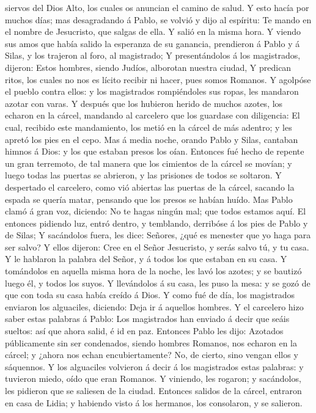 siervos del Dios Alto, los cuales os anuncian el camino de salud.
 Y esto hacía por muchos días; mas desagradando á Pablo,
se volvió y dijo al espíritu: Te mando en el nombre de Jesucristo, que
salgas de ella. Y salió en la misma hora.  Y viendo sus
amos que había salido la esperanza de su ganancia, prendieron á Pablo y
á Silas, y los trajeron al foro, al magistrado;  Y
presentándolos á los magistrados, dijeron: Estos hombres, siendo Judíos,
alborotan nuestra ciudad,  Y predican ritos, los cuales
no nos es lícito recibir ni hacer, pues somos Romanos.  Y
agolpóse el pueblo contra ellos: y los magistrados rompiéndoles sus
ropas, les mandaron azotar con varas.  Y después que los
hubieron herido de muchos azotes, los echaron en la cárcel, mandando al
carcelero que los guardase con diligencia:  El cual,
recibido este mandamiento, los metió en la cárcel de más adentro; y les
apretó los pies en el cepo.  Mas á media noche, orando
Pablo y Silas, cantaban himnos á Dios: y los que estaban presos los
oían.  Entonces fué hecho de repente un gran terremoto,
de tal manera que los cimientos de la cárcel se movían; y luego todas
las puertas se abrieron, y las prisiones de todos se soltaron.
 Y despertado el carcelero, como vió abiertas las puertas
de la cárcel, sacando la espada se quería matar, pensando que los presos
se habían huído.  Mas Pablo clamó á gran voz, diciendo:
No te hagas ningún mal; que todos estamos aquí.  El
entonces pidiendo luz, entró dentro, y temblando, derribóse á los pies
de Pablo y de Silas;  Y sacándolos fuera, les dice:
Señores, ¿qué es menester que yo haga para ser salvo?  Y
ellos dijeron: Cree en el Señor Jesucristo, y serás salvo tú, y tu casa.
 Y le hablaron la palabra del Señor, y á todos los que
estaban en su casa.  Y tomándolos en aquella misma hora
de la noche, les lavó los azotes; y se bautizó luego él, y todos los
suyos.  Y llevándolos á su casa, les puso la mesa: y se
gozó de que con toda su casa había creído á Dios.  Y como
fué de día, los magistrados enviaron los alguaciles, diciendo: Deja ir á
aquellos hombres.  Y el carcelero hizo saber estas
palabras á Pablo: Los magistrados han enviado á decir que seáis sueltos:
así que ahora salid, é id en paz.  Entonces Pablo les
dijo: Azotados públicamente sin ser condenados, siendo hombres Romanos,
nos echaron en la cárcel; y ¿ahora nos echan encubiertamente? No, de
cierto, sino vengan ellos y sáquennos.  Y los alguaciles
volvieron á decir á los magistrados estas palabras: y tuvieron miedo,
oído que eran Romanos.  Y viniendo, les rogaron; y
sacándolos, les pidieron que se saliesen de la ciudad. 
Entonces salidos de la cárcel, entraron en casa de Lidia; y habiendo
visto á los hermanos, los consolaron, y se salieron.

